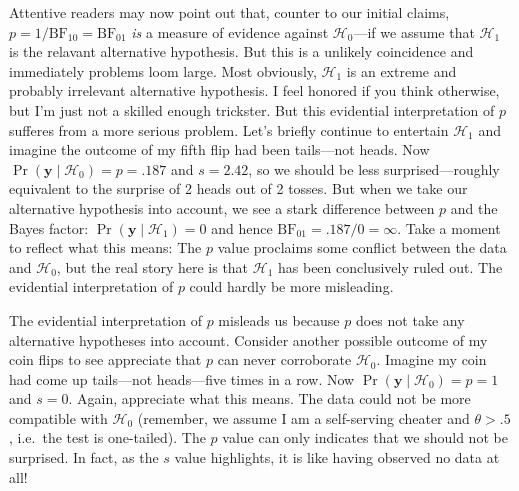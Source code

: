 \documentclass[
  man,
  floatsintext,
  longtable,
  nolmodern,
  notxfonts,
  notimes,
  colorlinks=true,linkcolor=blue,citecolor=blue,urlcolor=blue]{apa7}
\begin{document}
Attentive readers may now point out that, counter to our initial claims,
\(p = 1/\text{BF}_{10} = \text{BF}_{01}\) \emph{is} a measure of
evidence against \(\mathcal{H}_0\)---if we assume that \(\mathcal{H}_1\)
is the relavant alternative hypothesis. But this is a unlikely
coincidence and immediately problems loom large. Most obviously,
\(\mathcal{H}_1\) is an extreme and probably irrelevant alternative
hypothesis. I feel honored if you think otherwise, but I'm just not a
skilled enough trickster. But this evidential interpretation of \(p\)
sufferes from a more serious problem. Let's briefly continue to
entertain \(\mathcal{H}_1\) and imagine the outcome of my fifth flip had
been tails---not heads. Now
\(\Pr(\mathbf{y} \mid \mathcal{H}_0) = p = .187\) and \(s = 2.42\), so
we should be less surprised---roughly equivalent to the surprise of 2
heads out of 2 tosses. But when we take our alternative hypothesis into
account, we see a stark difference between \(p\) and the Bayes factor:
\(\Pr(\mathbf{y} \mid \mathcal{H}_1) = 0\) and hence
\(\text{BF}_{01} = .187/0 = \infty\). Take a moment to reflect what this
means: The \(p\) value proclaims some conflict between the data and
\(\mathcal{H}_0\), but the real story here is that \(\mathcal{H}_1\) has
been conclusively ruled out. The evidential interpretation of \(p\)
could hardly be more misleading.

The evidential interpretation of \(p\) misleads us because \(p\) does
not take any alternative hypotheses into account. Consider another
possible outcome of my coin flips to see appreciate that \(p\) can never
corroborate \(\mathcal{H}_0\). Imagine my coin had come up tails---not
heads---five times in a row. Now
\(\Pr(\mathbf{y} \mid \mathcal{H}_0) = p = 1\) and \(s = 0\). Again,
appreciate what this means. The data could not be more compatible with
\(\mathcal{H}_0\) (remember, we assume I am a self-serving cheater and
\(\theta > .5\), i.e.~the test is one-tailed). The \(p\) value can only
indicates that we should not be surprised. In fact, as the \(s\) value
highlights, it is like having observed no data at all!
\end{document}
